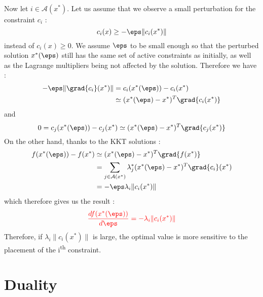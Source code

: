 \documentclass[a4paper]{article}
\begin{document}
{{{			\paragraph{}  Now let $i\in\mathcal{A}(x^*)$. Let us assume that we observe a small perturbation for the constraint $c_i$ : 
			\begin{equation}
				c_i(x) \geq -\eps \lVert c_i(x^*) \rVert 
			\end{equation}
			instead of $c_i(x)\geq 0$. We assume $\eps$ to be small enough so that the perturbed solution $x^*(\eps)$ still has the same set of active constraints as initially, as well as the Lagrange multipliers being not affected by the solution. Therefore we have : 
			\begin{equation}
				\begin{aligned}
					-\eps\lVert \grad{c_i}(x^*) \rVert &= c_i(x^*(\eps)) - c_i(x^*) \\
											&\simeq (x^*(\eps) - x^*)^T \grad{c_i(x^*)} 
				\end{aligned}
			\end{equation}
			and 
			\begin{equation}
				0 = c_j(x^*(\eps)) - c_j(x^*)  \simeq (x^*(\eps) - x^*)^T \grad{c_j(x^*)} 
			\end{equation}
			On the other hand, thanks to the KKT solutions : 
			\begin{equation}
				\begin{aligned}
					f(x^*(\eps)) - f(x^*) &\simeq (x^*(\eps)- x^*)^T\grad{f(x^*)} \\
								     &= \sum_{j\in\mathcal{A}(x^*)} \lambda_j^*(x^*(\eps)-x^*)^T\grad{c_i}(x^*) \\
								     &= -\eps\lambda_i\lVert c_i(x^*) \rVert 
				\end{aligned}
			\end{equation}
			which therefore gives us the result : 
			\begin{equation}
				\color{red}
				\frac{df(x^*(\eps))}{d\eps} = -\lambda_i \lVert c_i(x^*) \rVert 
			\end{equation}
			Therefore, if $\lambda_i \lVert c_i(x^*)\rVert $ is large, the optimal value is more sensitive to the placement of the i\textsuperscript{th} constraint. 
		}
	}
	
	\section{Duality}
	{
}}
\end{document}
